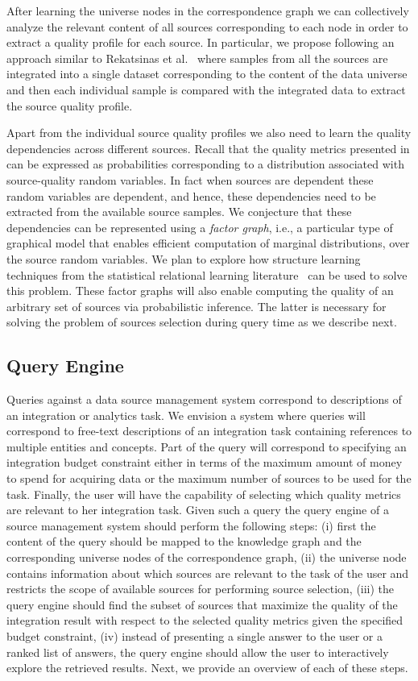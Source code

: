 \documentclass{sig-alternate}
\begin{document}
After learning the universe nodes in the correspondence graph we can collectively analyze the relevant content of all sources corresponding to each node in order to extract a quality profile for each source. In particular, we propose following an approach similar to Rekatsinas et al.~\cite{rekatsinas:2014} where samples from all the sources are integrated into a single dataset corresponding to the content of the data universe and then each individual sample is compared with the integrated data to extract the source quality profile. 

Apart from the individual source quality profiles we also need to learn the quality dependencies across different sources. Recall that the quality metrics presented in  
can be expressed as probabilities corresponding to a distribution associated with source-quality random variables. In fact when sources are dependent these random variables are dependent, and hence, these dependencies need to be extracted from the available source samples.  We conjecture that these dependencies can be represented using a {\em factor graph}, i.e., a particular type of graphical model that enables efficient computation of marginal distributions, over the source random variables. We plan to explore how structure learning techniques from the statistical relational learning literature~\cite{getoor:2007} can be used to solve this problem. These factor graphs will also enable computing the quality of an arbitrary set of sources via probabilistic inference. The latter is necessary for solving the problem of sources selection during query time as we describe next. 

\subsection{Query Engine}
Queries against a data source management system correspond to descriptions of an integration or analytics task. We envision a system where queries will correspond to free-text descriptions of an integration task containing references to multiple entities and concepts. Part of the query will correspond to specifying an integration budget constraint either in terms of the maximum amount of money to spend for acquiring data or the maximum number of sources to be used for the task. Finally, the user will have the capability of selecting which quality metrics are relevant to her integration task. Given such a query the query engine of a source management system should perform the following steps: (i) first the content of the query should be mapped to the knowledge graph and the corresponding universe nodes of the correspondence graph, (ii) the universe node contains information about which sources are relevant to the task of the user and restricts the scope of available sources for performing source selection, (iii) the query engine should find the subset of sources that maximize the quality of the integration result with respect to the selected quality metrics given the specified budget constraint, (iv) instead of presenting a single answer to the user or a ranked list of answers, the query engine should allow the user to interactively explore the retrieved results. Next, we provide an overview of each of these steps.
\end{document}
